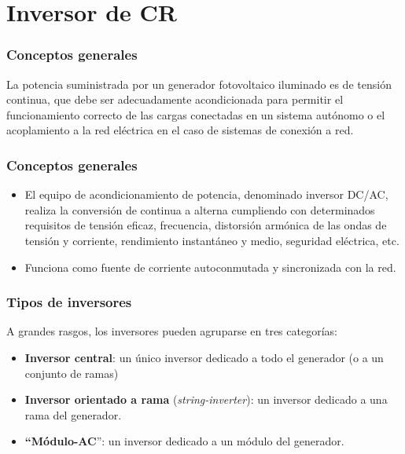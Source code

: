 \documentclass[serif, xcolor=dvipsnames]{beamer}
\begin{document}
\section{Inversor de CR}


\begin{frame}
  \frametitle{Conceptos generales}
  \begin{block} {}

    La potencia suministrada por un generador fotovoltaico iluminado
    es de tensión continua, que debe ser adecuadamente acondicionada
    para permitir el funcionamiento correcto de las cargas conectadas
    en un sistema autónomo o el acoplamiento a la red eléctrica en el
    caso de sistemas de conexión a red.

  \end{block}

\end{frame}
\begin{frame}
  \frametitle{Conceptos generales}
  \begin{block} {}
    \begin{itemize}
    \item El equipo de acondicionamiento de potencia, denominado
      inversor DC/AC, realiza la conversión de continua a alterna
      cumpliendo con determinados requisitos de tensión eficaz,
      frecuencia, distorsión armónica de las ondas de tensión y
      corriente, rendimiento instantáneo y medio, seguridad eléctrica,
      etc.
    \item Funciona como fuente de corriente autoconmutada y
      sincronizada con la red.
    \end{itemize}
  \end{block}

\end{frame}
\begin{frame}
  \frametitle{Tipos de inversores}

  A grandes rasgos, los inversores pueden agruparse en tres
  categorías:
  \begin{itemize}
  \item \textbf{Inversor central}: un único inversor dedicado a todo
    el generador (o a un conjunto de ramas)
  \item \textbf{Inversor orientado a rama} (\emph{string-inverter}):
    un inversor dedicado a una rama del generador.
  \item \textbf{{}``Módulo-AC}'': un inversor dedicado a un módulo del
    generador.
  \end{itemize}

\end{frame}
\end{document}
